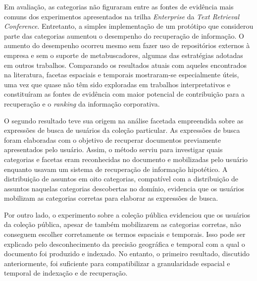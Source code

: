 Em avaliação, as categorias não figuraram entre as fontes de evidência mais comuns dos experimentos apresentados na trilha \textit{Enterprise} da \textit{Text Retrieval Conference}. Entretanto, a simples implementação de um protótipo que considerou parte das categorias aumentou o desempenho do recuperação de informação. O aumento do desempenho ocorreu mesmo sem fazer uso de repositórios externos à empresa e sem o suporte de metabuscadores, algumas das estratégias adotadas em outros trabalhos. Comparando os resultados atuais com aqueles encontrados na literatura, facetas espaciais e temporais mostraram-se especialmente úteis, uma vez que quase não têm sido exploradas em trabalhos interpretativos e constituíram as fontes de evidência com maior potencial de contribuição para a recuperação e o \textit{ranking} da informação corporativa.


O segundo resultado teve sua origem na análise facetada empreendida sobre as expressões de busca de usuários da coleção particular. As expressões de busca foram elaboradas com o objetivo de recuperar documentos previamente apresentados pelo usuário. Assim, o método serviu para investigar quais categorias e facetas eram reconhecidas no documento e mobilizadas pelo usuário enquanto usavam um sistema de recuperação de informação hipotético. A distribuição de assuntos em oito categorias, compatível com a distribuição de assuntos naquelas categorias descobertas no domínio, evidencia que os usuários mobilizam as categorias corretas para elaborar as expressões de busca.

Por outro lado, o experimento sobre a coleção pública evidenciou que os usuários da coleção pública, apesar de também mobilizarem as categorias corretas, não conseguem escolher corretamente os termos espaciais e temporais. Isso pode ser explicado pelo desconhecimento da precisão geográfica e temporal com a qual o documento foi produzido e indexado. No entanto, o primeiro resultado, discutido anteriormente, foi suficiente para compatibilizar a granularidade espacial e temporal de indexação e de recuperação.



